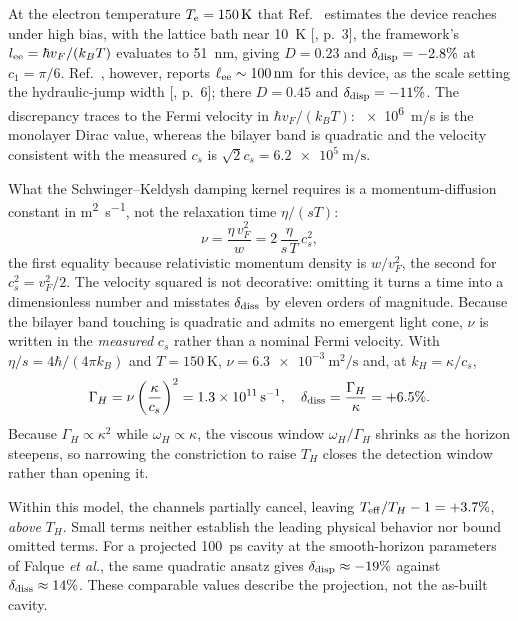 \documentclass[aps,prl,twocolumn,superscriptaddress,nofootinbib]{revtex4-2}
\begin{document}
At the electron temperature $T_{\rm e} = \SI{150}{\kelvin}$ that
Ref.~\cite{Geurs2025} estimates the device reaches under high bias, with
the lattice bath near \SI{10}{\kelvin} [, p.~3], the
framework's $l_{\rm ee} = \hbar v_F/(k_B T)$ evaluates to
\SI{51}{\nano\meter}, giving $D = 0.23$ and
$\delta_{\rm disp} = -2.8\%$ at $c_1 = \pi/6$. Ref.~\cite{Geurs2025},
however, reports $\ell_{\rm ee} \sim \SI{100}{\nano\meter}$ for this
device, as the scale setting the hydraulic-jump width
[, p.~6]; there $D = 0.45$ and
$\delta_{\rm disp} = -11\%$. The discrepancy traces to the Fermi velocity
in $\hbar v_F/(k_B T)$: \SI{e6}{\meter/\second} is the monolayer Dirac
value, whereas the bilayer band is quadratic and the velocity consistent
with the measured $c_s$ is $\sqrt{2}c_s = \SI{6.2e5}{\meter/\second}$.

What the Schwinger--Keldysh damping kernel requires is a
momentum-diffusion constant in \si{\meter\squared\per\second}, not the
relaxation time $\eta/(sT)$:
\begin{equation}
\nu = \frac{\eta\,v_F^2}{w} = 2\,\frac{\eta}{s\,T}\,c_s^2 ,
\label{eq:nu}
\end{equation}
the first equality because relativistic momentum density is $w/v_F^2$, the
second for $c_s^2 = v_F^2/2$. The velocity squared is not decorative:
omitting it turns a time into a dimensionless number and misstates
$\delta_{\rm diss}$ by eleven orders of magnitude. Because the bilayer band
touching is quadratic and admits no emergent light cone, $\nu$ is written
in the \emph{measured} $c_s$ rather than a nominal Fermi velocity. With
$\eta/s = 4\hbar/(4\pi k_B)$ and $T = \SI{150}{\kelvin}$,
$\nu = \SI{6.3e-3}{\meter\squared\per\second}$ and, at $k_H = \kappa/c_s$,
\begin{equation}
\Gamma_H = \nu \left(\frac{\kappa}{c_s}\right)^2
= \SI{1.3e11}{\per\second}, \quad
\delta_{\rm diss} = \frac{\Gamma_H}{\kappa} = +6.5\%.
\label{eq:diss}
\end{equation}
Because $\Gamma_H \propto \kappa^2$ while $\omega_H \propto \kappa$, the
viscous window $\omega_H/\Gamma_H$ shrinks as the horizon steepens, so
narrowing the constriction to raise $T_H$ closes the detection window
rather than opening it.

Within this model, the channels partially cancel, leaving
$T_{\rm eff}/T_H - 1 = +3.7\%$, \emph{above} $T_H$. Small terms
neither establish the leading physical behavior nor bound omitted terms.
For a projected
\SI{100}{\pico\second} cavity at the smooth-horizon parameters of
Falque \emph{et al.}, the same quadratic ansatz gives
$\delta_{\rm disp} \approx -19\%$ against
$\delta_{\rm diss} \approx 14\%$. These comparable values describe
the projection, not the as-built cavity.
\end{document}
